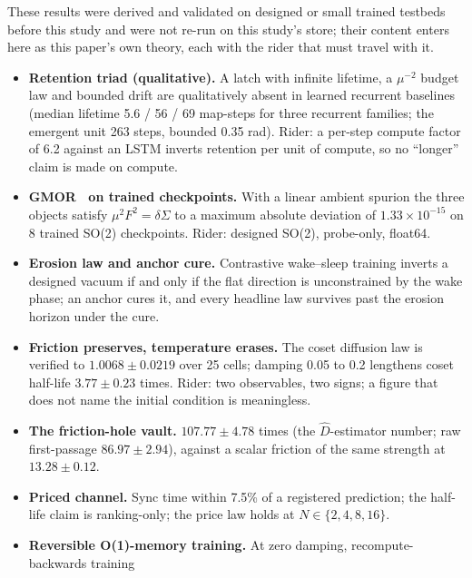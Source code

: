 \documentclass{article} %
\newcommand{\sci}[2]{\ensuremath{#1\times10^{#2}}}
\begin{document}
These results were derived and validated on designed or small trained testbeds before this study
and were not re-run on this study's store; their content enters here as this paper's own theory,
each with the rider that must travel with it. %
\begin{itemize}[leftmargin=*,itemsep=1pt]
\item \textbf{Retention triad (qualitative).} A latch with infinite lifetime, a $\mu^{-2}$ budget
  law and bounded drift are qualitatively absent in learned recurrent baselines (median lifetime 5.6
  / 56 / 69 map-steps for three recurrent families; the emergent unit 263 steps, bounded 0.35 rad).
  Rider: a per-step compute factor of 6.2 against an LSTM inverts retention per unit of compute, so
  no ``longer'' claim is made on compute. %
\item \textbf{GMOR~\citep{gellmann1968behavior} on trained checkpoints.} With a linear ambient spurion the three objects satisfy
  $\mu^2F^2=\delta\Sigma$ to a maximum absolute deviation of \sci{1.33}{-15} on 8 trained SO(2)
  checkpoints. Rider: designed SO(2), probe-only, float64. %
\item \textbf{Erosion law and anchor cure.} Contrastive wake--sleep training inverts a designed
  vacuum if and only if the flat direction is unconstrained by the wake phase; an anchor cures it,
  and every headline law survives past the erosion horizon under the cure. %
\item \textbf{Friction preserves, temperature erases.} The coset diffusion law is verified to
  $1.0068\pm0.0219$ over 25 cells; damping 0.05 to 0.2 lengthens coset half-life
  $3.77\pm0.23$ times. Rider: two observables, two signs; a figure that does not name the initial
  condition is meaningless. %
\item \textbf{The friction-hole vault.} $107.77\pm4.78$ times (the $\hat D$-estimator number; raw
  first-passage $86.97\pm2.94$), against a scalar friction of the same strength at
  $13.28\pm0.12$. %
\item \textbf{Priced channel.} Sync time within 7.5\% of a registered prediction; the half-life
  claim is ranking-only; the price law holds at $N\in\{2,4,8,16\}$. %
\item \textbf{Reversible O(1)-memory training.} At zero damping, recompute-backwards training

\end{itemize}
\end{document}
